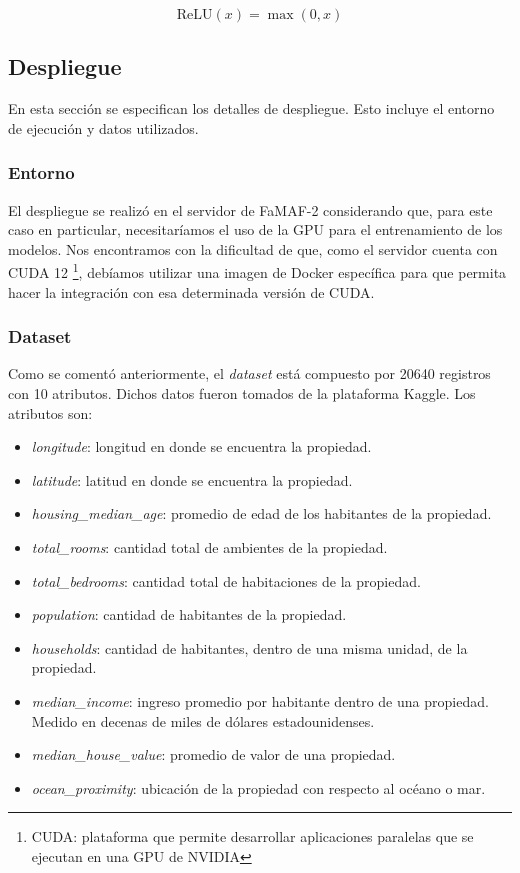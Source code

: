 \documentclass[11pt]{article}
\let\Oldsubsection\subsection
\renewcommand{\subsection}{\FloatBarrier\Oldsubsection}
\let\Oldsubsubsection\subsubsection
\renewcommand{\subsubsection}{\FloatBarrier\Oldsubsubsection}
\newcommand{\english}[1]{\textit{#1}}
\begin{document}
\begin{equation}
\text{ReLU}(x) = \max(0, x)
\end{equation}


\subsection{Despliegue}

En esta sección se especifican los detalles de despliegue. Esto incluye el entorno de ejecución y datos utilizados.

\subsubsection{Entorno}

El despliegue se realizó en el servidor de FaMAF-2 considerando que, para este caso en particular, necesitaríamos el uso de la GPU para el entrenamiento de los modelos. Nos encontramos con la dificultad de que, como el servidor cuenta con CUDA 12 \footnote{CUDA: plataforma que permite desarrollar aplicaciones paralelas que se ejecutan en una GPU de NVIDIA}, debíamos utilizar una imagen de Docker específica para que permita hacer la integración con esa determinada versión de CUDA.

\subsubsection{Dataset}

Como se comentó anteriormente, el \english{dataset} está compuesto por 20640 registros con 10 atributos. Dichos datos fueron tomados de la plataforma Kaggle. Los atributos son:

\begin{itemize}
    \item \english{longitude}: longitud en donde se encuentra la propiedad.
    \item \english{latitude}: latitud en donde se encuentra la propiedad.
    \item \english{housing\_median\_age}: promedio de edad de los habitantes de la propiedad.
    \item \english{total\_rooms}: cantidad total de ambientes de la propiedad.
    \item \english{total\_bedrooms}: cantidad total de habitaciones de la propiedad.
    \item \english{population}: cantidad de habitantes de la propiedad.
    \item \english{households}: cantidad de habitantes, dentro de una misma unidad, de la propiedad.
    \item \english{median\_income}: ingreso promedio por habitante dentro de una propiedad. Medido en decenas de miles de dólares estadounidenses.
    \item \english{median\_house\_value}: promedio de valor de una propiedad.
    \item \english{ocean\_proximity}: ubicación de la propiedad con respecto al océano o mar.
\end{itemize}
\end{document}
